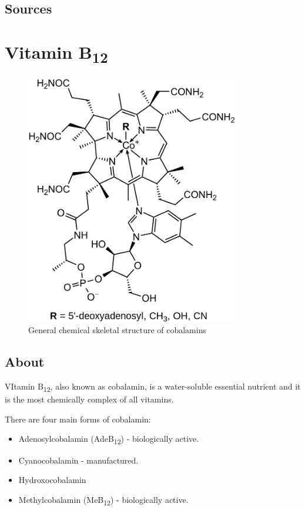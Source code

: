 \documentclass{book}
\begin{document}
\begin{sloppypar}
\section{Sources}


\chapter{Vitamin B\texorpdfstring{\textsubscript{12}}{12}}
\begin{figure}[h]
	\caption{General chemical skeletal structure of cobalamins}
	\centering \includegraphics[width=0.83\textwidth]{images/Vitamin_B12_chemical_structure}
\end{figure}
\newpage

\section{About}
VItamin B\textsubscript{12}, also known as cobalamin, is a water-soluble essential nutrient and it is the most chemically complex of all vitamins.

There are four main forms of cobalamin:
\begin{itemize}
	\item Adenosylcobalamin (AdeB\textsubscript{12}) - biologically active.
	\item Cyanocobalamin - manufactured.
	\item Hydroxocobalamin
	\item Methylcobalamin (MeB\textsubscript{12}) - biologically active.
\end{itemize}


\end{sloppypar}
\end{document}
